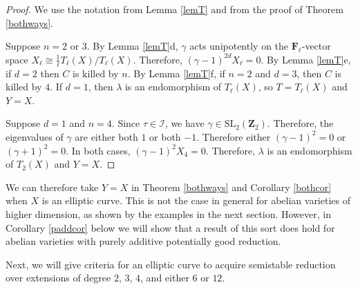 \documentclass{amsart}
\def\Z{{\mathbf Z}}
\def\F{{\mathbf F}}
\def\I{{\mathcal I}}
\def\SL{\mathrm{SL}}
\theoremstyle{definition}
\begin{document}
\begin{proof}
We use the notation from Lemma \ref{lemT} and from the proof of 
Theorem \ref{bothways}.

Suppose $n = 2$ or $3$.
By Lemma \ref{lemT}d, $\gamma$ acts unipotently on the
$\F_{\ell}$-vector space 
$X_{\ell} \cong \frac{1}{\ell}T_{\ell}(X)/T_{\ell}(X)$.
Therefore,
$(\gamma - 1)^{2d}X_{\ell} = 0$. 
By Lemma \ref{lemT}e, if $d = 2$ then
$C$ is killed by $n$. By Lemma \ref{lemT}f, if $n = 2$ and $d = 3$, 
then $C$ is killed by $4$. 
If $d = 1$, then $\lambda$ is an endomorphism of $T_{\ell}(X)$,
so $T = T_{\ell}(X)$ and $Y = X$. 

Suppose $d = 1$ and $n = 4$. Since $\tau \in \I$, we have 
$\gamma \in \SL_{2}(\Z_{2})$. Therefore, the eigenvalues of 
$\gamma$ are either both $1$ or both $-1$. Therefore either
$(\gamma - 1)^{2} = 0$ or $(\gamma + 1)^{2} = 0$. In both cases,
$(\gamma - 1)^{2}X_{4} = 0$. Therefore, 
$\lambda$ is an endomorphism of $T_{2}(X)$ and 
$Y = X$.
\end{proof}

We can therefore take $Y = X$ in Theorem \ref{bothways} and 
Corollary \ref{bothcor} when $X$ is an elliptic curve.
This is not the case in general for abelian varieties
of higher dimension, as shown by the examples in the next section.
However, in Corollary \ref{paddcor} below we will show
that a result of this sort does hold for abelian varieties
with purely additive potentially good reduction. 

Next, we will give criteria for an elliptic curve to
acquire semistable reduction over extensions of degree
$2$, $3$, $4$, and either $6$ or $12$.
\end{document}
